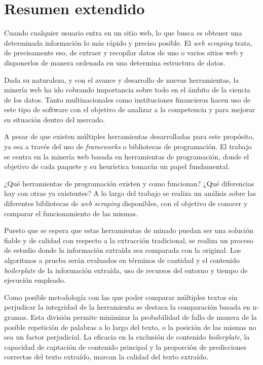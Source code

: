 \chapter*{Resumen extendido}
\label{cha:resumen-extendido}

Cuando cualquier usuario entra en un sitio web, lo que busca es obtener una determinada información lo más
rápido y preciso posible. El \emph{web scraping} trata, de precisamente eso, de extraer y recopilar datos 
de uno o varios sitios web y disponerlos de manera ordenada en una determina estructura de datos.

Dada su naturaleza, y con el avance y desarrollo de nuevas herramientas, la minería web ha ido cobrando 
importancia sobre todo en el ámbito de la ciencia de los datos. Tanto multinacionales como instituciones 
financieras hacen uso de este tipo de software con el objetivo de analizar a la competencia y para mejorar 
su situación dentro del mercado. 

A pesar de que existen múltiples herramientas desarrolladas para este propósito, ya sea a través del uso 
de \emph{frameworks} o bibliotecas de programación. El trabajo se centra en la minería web basada en 
herramientas de programación, donde el objetivo de cada paquete y su heurística tomarán un papel fundamental.

¿Qué herramientas de programación existen y como funcionan? ¿Qué diferencias hay con otras ya existentes?
A lo largo del trabajo se realiza un análisis sobre las diferentes bibliotecas de \emph{web scraping}
disponibles, con el objetivo de conocer y comparar el funcionamiento de las mismas.

Puesto que se espera que estas herramientas de minado puedan ser una solución fiable y de calidad con
respecto a la extracción tradicional, se realiza un proceso de estudio donde la información extraída sea
comparada con la original. Los algoritmos a prueba serán evaluados en términos de cantidad y el contenido
\emph{boilerplate} de la información extraída, uso de recursos del entorno y tiempo de ejecución empleado.

Como posible metodología con las que poder comparar múltiples textos sin perjudicar la integridad de la
herramienta se destaca la comparación basada en n-gramas. Esta división permite minimizar la probabilidad
de fallo de manera de la posible repetición de palabras a lo largo del texto, o la posición de las mismas
no sea un factor perjudicial. La eficacia en la exclusión de contenido \emph{boilerplate}, la capacidad de
captación de contenido principal y la proporción de predicciones correctas del texto extraído, marcan la
calidad del texto extraído.

